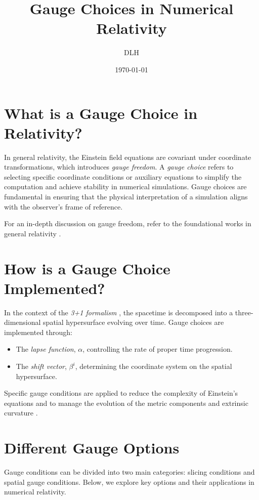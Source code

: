 \documentclass[11pt,a4paper]{article}
\title{Gauge Choices in Numerical Relativity}
\author{DLH}
\date{\today}
\begin{document}
\maketitle
\tableofcontents

\section{What is a Gauge Choice in Relativity?}
In general relativity, the Einstein field equations are covariant under coordinate transformations, which introduces \textit{gauge freedom}. A \textit{gauge choice} refers to selecting specific coordinate conditions or auxiliary equations to simplify the computation and achieve stability in numerical simulations. Gauge choices are fundamental in ensuring that the physical interpretation of a simulation aligns with the observer's frame of reference.

For an in-depth discussion on gauge freedom, refer to the foundational works in general relativity \cite{wald1984general,gourgoulhon2012three}.

\section{How is a Gauge Choice Implemented?}
In the context of the \textit{3+1 formalism} \cite{gourgoulhon2012three,alcubierre2008introduction}, the spacetime is decomposed into a three-dimensional spatial hypersurface evolving over time. Gauge choices are implemented through:
\begin{itemize}
    \item The \textit{lapse function}, $\alpha$, controlling the rate of proper time progression.
    \item The \textit{shift vector}, $\beta^i$, determining the coordinate system on the spatial hypersurface.
\end{itemize}

Specific gauge conditions are applied to reduce the complexity of Einstein's equations and to manage the evolution of the metric components and extrinsic curvature \cite{baumgarte2010numerical,alcubierre2008introduction}. 

\section{Different Gauge Options}
Gauge conditions can be divided into two main categories: slicing conditions and spatial gauge conditions. Below, we explore key options and their applications in numerical relativity.
\end{document}
